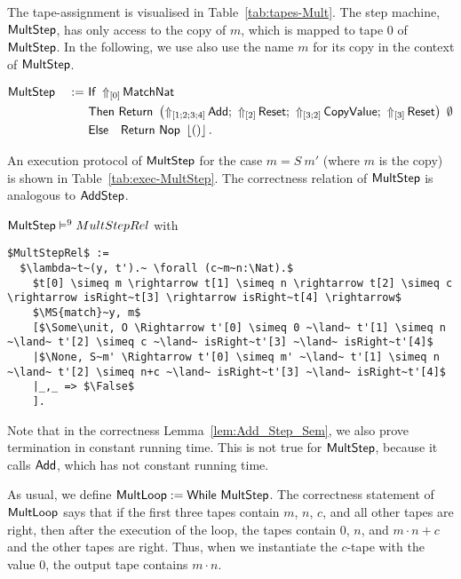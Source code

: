 The tape-assignment is visualised in Table~\ref{tab:tapes-Mult}.  The step machine, $\MS{MultStep}$, has only access to the copy of $m$, which is
mapped to tape $0$ of $\MS{MultStep}$.  In the following, we use also use the name $m$ for its copy in the context of $\MS{MultStep}$.
\begin{definition}
  \label{def:Mult_Step}
  \begin{alignat*}{2}
    &\MS{MultStep} &~:=~&
           \MS{If}~\LiftTapes{\MS{MatchNat}}{\Vector{0}} \\
    &&& \MS{Then}  ~\Return{\left( \LiftTapes{\MS{Add}}{\Vector{1;2;3;4}} \Seq
                                \LiftTapes{\MS{Reset}}{\Vector{2}} \Seq
                                \LiftTapes{\MS{CopyValue}}{\Vector{3;2}} \Seq
                                \LiftTapes{\MS{Reset}}{\Vector{3}} \right)}{\None} \\
    &&& \MS{Else}~~~\Return{\MS{Nop}}{\Some\unit}.
  \end{alignat*}
\end{definition}
An execution protocol of $\MS{MultStep}$ for the case $m=S~m'$ (where $m$ is the copy) is shown in Table~\ref{tab:exec-MultStep}.  The correctness
relation of $\MS{MultStep}$ is analogous to $\MS{AddStep}$.
\begin{lemma}
  \label{lem:Mult_Step_Sem}
  $\MS{MultStep} \RealiseIn{9} MultStepRel$ with
  \small
\begin{lstlisting}[style=semicoqstyle]
$MultStepRel$ :=
  $\lambda~t~(y, t').~ \forall (c~m~n:\Nat).$
    $t[0] \simeq m \rightarrow t[1] \simeq n \rightarrow t[2] \simeq c \rightarrow isRight~t[3] \rightarrow isRight~t[4] \rightarrow$
    $\MS{match}~y, m$
    [$\Some\unit, O \Rightarrow t'[0] \simeq 0 ~\land~ t'[1] \simeq n ~\land~ t'[2] \simeq c ~\land~ isRight~t'[3] ~\land~ isRight~t'[4]$
    |$\None, S~m' \Rightarrow t'[0] \simeq m' ~\land~ t'[1] \simeq n ~\land~ t'[2] \simeq n+c ~\land~ isRight~t'[3] ~\land~ isRight~t'[4]$
    |_,_ => $\False$
    ].
\end{lstlisting}
\end{lemma}
Note that in the correctness Lemma~\ref{lem:Add_Step_Sem}, we also prove termination in constant running time.  This is not true for $\MS{MultStep}$,
because it calls $\MS{Add}$, which has not constant running time.

As usual, we define $\MS{MultLoop} := \While~\MS{MultStep}$.  The correctness statement of $\MS{MultLoop}$ says that if the first three tapes contain
$m$, $n$, $c$, and all other tapes are right, then after the execution of the loop, the tapes contain $0$, $n$, and $m \cdot n + c$ and the other
tapes are right.  Thus, when we instantiate the $c$-tape with the value $0$, the output tape contains $m \cdot n$.

